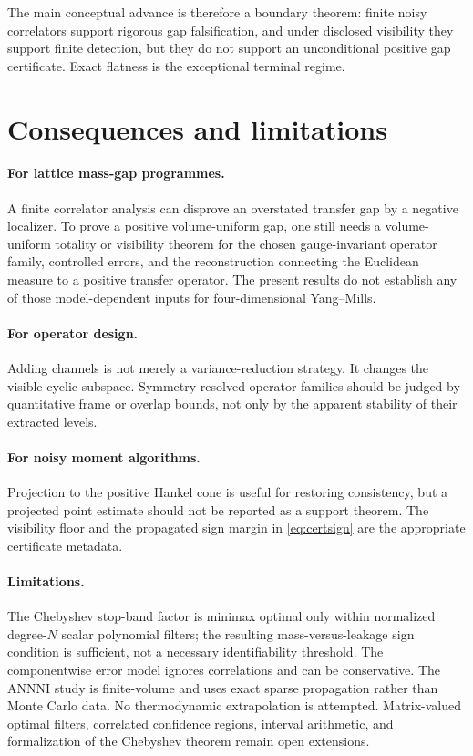 \documentclass[11pt]{article}
\theoremstyle{definition}
\theoremstyle{remark}
\begin{document}
The main conceptual advance is therefore a boundary theorem: finite noisy
correlators support rigorous gap falsification, and under disclosed visibility
they support finite detection, but they do not support an unconditional
positive gap certificate.  Exact flatness is the exceptional terminal regime.

\section{Consequences and limitations}

\paragraph{For lattice mass-gap programmes.}
A finite correlator analysis can disprove an overstated transfer gap by a
negative localizer.  To prove a positive volume-uniform gap, one still needs a
volume-uniform totality or visibility theorem for the chosen gauge-invariant
operator family, controlled errors, and the reconstruction connecting the
Euclidean measure to a positive transfer operator.  The present results do not
establish any of those model-dependent inputs for four-dimensional
Yang--Mills.

\paragraph{For operator design.}
Adding channels is not merely a variance-reduction strategy.  It changes the
visible cyclic subspace.  Symmetry-resolved operator families should be judged
by quantitative frame or overlap bounds, not only by the apparent stability of
their extracted levels.

\paragraph{For noisy moment algorithms.}
Projection to the positive Hankel cone is useful for restoring consistency,
but a projected point estimate should not be reported as a support theorem.
The visibility floor and the propagated sign margin in
\cref{eq:certsign} are the appropriate certificate metadata.

\paragraph{Limitations.}
The Chebyshev stop-band factor is minimax optimal only within normalized
degree-$N$ scalar polynomial filters; the resulting mass-versus-leakage sign
condition is sufficient, not a necessary identifiability threshold.  The
componentwise error model ignores correlations and can be conservative.  The
ANNNI study is finite-volume and uses exact sparse propagation rather than
Monte Carlo data.  No thermodynamic extrapolation is attempted.  Matrix-valued
optimal filters, correlated confidence regions, interval arithmetic, and
formalization of the Chebyshev theorem remain open extensions.
\end{document}
